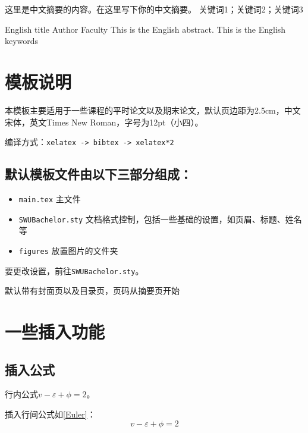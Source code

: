\documentclass[zihao=-4,hyperref,a4paper,UTF8,autoindent=2em]{ctexart}
\begin{document}
\cover
\thispagestyle{empty} %

\newpage
\tableofcontents

\newpage\setcounter{page}{1} 

\chineseabstract
    {这里是中文摘要的内容。在这里写下你的中文摘要。} %
    {关键词1；关键词2；关键词3} %

\englishabstract
    {English title} %
    {Author}  %
    {Faculty} %
    {This is the English abstract. } %
    {This is the English keywords } %

\newpage
\section{模板说明}

本模板主要适用于一些课程的平时论文以及期末论文，默认页边距为2.5cm，中文宋体，英文Times New Roman，字号为12pt（小四）。

编译方式：\verb|xelatex -> bibtex -> xelatex*2|

\subsection{默认模板文件由以下三部分组成：}
\begin{itemize}
    \item \texttt{main.tex} 主文件
    \item \texttt{SWUBachelor.sty} 文档格式控制，包括一些基础的设置，如页眉、标题、姓名等
    \item \texttt{figures} 放置图片的文件夹
\end{itemize}

要更改设置，前往\texttt{SWUBachelor.sty}。

默认带有封面页以及目录页，页码从摘要页开始

\newpage\section{一些插入功能}
\subsection{插入公式}
行内公式$v-\varepsilon+\phi=2$。

插入行间公式如\autoref{Euler}：
\begin{equation}
    v-\varepsilon+\phi=2
    \label{Euler}
\end{equation}
\end{document}
